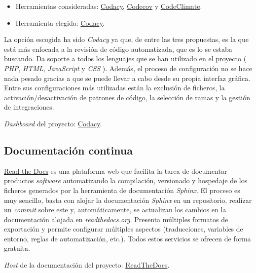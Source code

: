 \begin{itemize}
\tightlist
\item
  Herramientas consideradas: \href{https://codacy.com}{Codacy},
  \href{https://codecov.io/}{Codecov} y
  \href{https://codeclimate.com/}{CodeClimate}.
\item
  Herramienta elegida: \href{https://codacy.com}{Codacy}.
\end{itemize}

La opción escogida ha sido \emph{Codacy} ya que, de entre las tres
propuestas, es la que está más enfocada a la revisión de código
automatizada, que es lo se estaba buscando. Da soporte a todos los
lenguajes que se han utilizado en el proyecto ( \emph{PHP}, \emph{HTML},
\emph{JavaScript} y \emph{CSS} ). Además, el proceso de configuración no
se hace nada pesado gracias a que se puede llevar a cabo desde su propia
interfaz gráfica. Entre sus configuraciones más utilizadas están la
exclusión de ficheros, la activación/desactivación de patrones de
código, la selección de ramas y la gestión de integraciones.

\emph{Dashboard} del proyecto: \href{https://app.codacy.com/manual/gcm1001/TFG-CeniehAriadne/dashboard}{Codacy}.


\subsection{Documentación continua}

\href{https://readthedocs.org/}{Read the Docs} es una plataforma web que
facilita la tarea de documentar productos \emph{software} automatizando
la compilación, versionado y hospedaje de los ficheros generados por la
herramienta de documentación \emph{Sphinx}. El proceso es muy sencillo,
basta con alojar la documentación \emph{Sphinx} en un repositorio,
realizar un \emph{commit} sobre este y, automáticamente, se actualizan
los cambios en la documentación alojada en \emph{readthedocs.org}.
Presenta múltiples formatos de exportación y permite configurar
múltiples aspectos (traducciones, variables de entorno, reglas de
automatización, etc.). Todos estos servicios se ofrecen de forma
gratuita.

\emph{Host} de la documentación del proyecto: \href{tfg-ceniehariadne.rtfd.io}{ReadTheDocs}.


